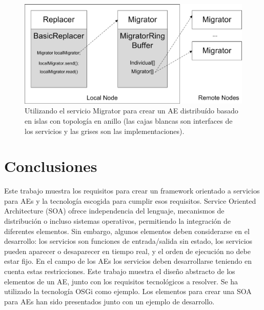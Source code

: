 \documentclass[runningheads]{llncs}
\begin{document}
\begin{figure}[ht] 
\begin{center} 
\includegraphics[scale=0.6]{images/migrator.eps}
\end{center} 
\caption{Utilizando el servicio Migrator para crear un AE distribuído basado en islas con topología en anillo (las cajas blancas son interfaces de los servicios y las grises son las implementaciones).} 
\label{MIGRATOR} 
\end{figure} 


\section{Conclusiones}
\label{sec:conclusions}
Este trabajo muestra los requisitos para crear un framework orientado a servicios para AEs y la tecnología escogida para cumplir esos requisitos.  Service Oriented Architecture (SOA) ofrece independencia del lenguaje, mecanismos de distribución o incluso sistemas operativos, permitiendo la integración de diferentes elementos. Sin embargo, algunos elementos deben considerarse en el desarrollo: los servicios son funciones de entrada/salida sin estado, los servicios pueden aparecer o desaparecer en tiempo real, y el orden de ejecución no debe estar fijo. En el campo de los AEs los servicios deben desarrollarse teniendo en cuenta estas restricciones. Este trabajo muestra el diseño abstracto de los elementos de un AE, junto con los requisitos tecnológicos a resolver. Se ha utilizado la tecnología OSGi como ejemplo. Los elementos para crear una SOA para AEs han sido presentados junto con un ejemplo de desarrollo.
\end{document}
